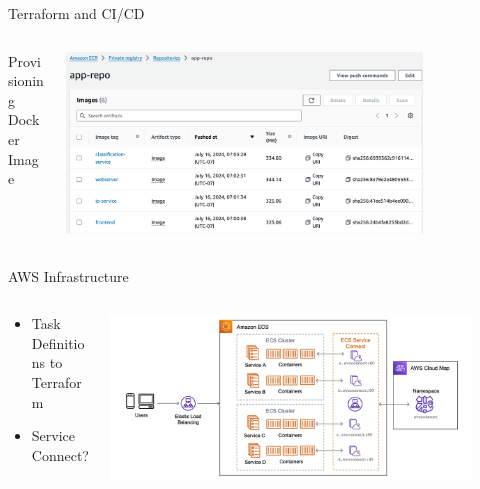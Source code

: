 \begin{frame}{Terraform and CI/CD}
    \begin{columns}
        \begin{column}{0.2\textwidth}
            Provisioning \\
            Docker Image
        \end{column}
        \begin{column}{0.8\textwidth}
            \includegraphics[height=0.8\textheight,width=0.8\textwidth,keepaspectratio]{images/mm_ecr.png} 
        \end{column}
    \end{columns}
\end{frame}

\begin{frame}{AWS Infrastructure}
    \begin{columns}
        \begin{column}{0.3\textwidth}
            \begin{itemize}
                \item Task Definitions to Terraform
                \item Service Connect? 
            \end{itemize}
        \end{column}
        \begin{column}{0.7\textwidth}
            \centering
            \includegraphics[height=0.9\textheight,width=0.9\textwidth,keepaspectratio]{images/mm_sc.jpg}
        \end{column}
    \end{columns}
\end{frame}

